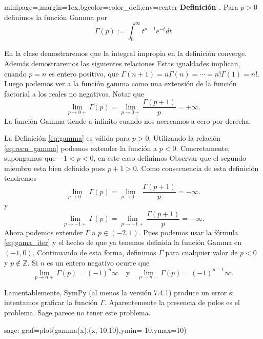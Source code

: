 \documentclass{article}
\newenvironment{colbox}[2]{%
    \begin{adjustbox}{minipage={\linewidth},margin=1ex,bgcolor=#1,env=center}
        #2}{%
    \end{adjustbox}%
}
\newcounter{defi_cont}
\newenvironment{definicion}[1]{\begin{colbox}{color_defi}{\refstepcounter{defi_cont}\textbf{Definición \arabic{defi_cont}.} #1}}{\end{colbox}}
\newcounter{lem_cont}
\renewcommand{\emph}[1]{\textcolor[rgb]{0,0,1}{#1}}
\begin{document}
\begin{definicion}\label{def:gamma} Para $p>0$ definimos la \emph{función Gamma} por 
\begin{equation}\label{eq:gamma}\Gamma(p):=\int_0^{\infty}t^{p-1}e^{-t}dt
\end{equation}
\end{definicion}

En la clase demostraremos que la integral impropia en la definición converge. Además demostraremos las siguientes relaciones
Estas igualdades  implican, cuando $p=n$ es entero positivo, que $\Gamma(n+1)=n\Gamma(n)=\cdots=n!\Gamma(1)=n!$. Luego podemos ver a la función gamma como una extensión de la función factorial a los reales no negativos. Notar que
\[\lim_{p\to 0+}\Gamma(p)=\lim_{p\to 0+}\frac{\Gamma(p+1)}{p}=+\infty.\]
La función Gamma tiende a  infinito cuando nos acercamos a cero por derecha.

La Definición \ref{eq:gamma} es válida para $p>0$. Utilizando la relación \eqref{eq:recu_gamma} podemos extender la función a $p<0$. Concretamente,  supongamos  que $-1<p<0$, en  este caso definimos
Observar que el segundo miembro esta bien definido pues $p+1>0$. Como consecuencia de esta definición tendremos
\[\lim_{p\to 0-}\Gamma(p)=\lim_{p\to 0-}\frac{\Gamma(p+1)}{p}=-\infty.\]
y 
\[\lim_{p\to -1+}\Gamma(p)=\lim_{p\to -1+}\frac{\Gamma(p+1)}{p}=-\infty.\] 
Ahora podemos extender $\Gamma$ a $p\in (-2,1)$. Pues  podemos usar la fórmula \eqref{eq:gama_iter} y el hecho de que ya tenemos definida la función Gamma en $(-1,0)$. Continuando de esta forma, definimos $\Gamma$ para cualquier valor de $p<0$ y $p\notin \mathbb{Z}$. Si $n$ es un entero negativo ocurre que
\[\lim_{p\to n+}\Gamma(p)=(-1)^n\infty\quad\text{y}\quad \lim_{p\to n-}\Gamma(p)=(-1)^{n-1}\infty.\] 



Lamentablemente, SymPy (al menos la versión 7.4.1) produce un error si intentamos graficar la función $\Gamma$. Aparentemente la presencia de polos es el problema. Sage parece no tener este problema. 


\begin{sagecommandline}
 sage: graf=plot(gamma(x),(x,-10,10),ymin=-10,ymax=10)
\end{sagecommandline}
\end{document}
